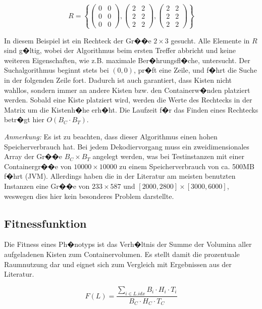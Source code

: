 \documentclass[a4paper,abstracton,12pt]{scrartcl}
\begin{document}
\begin{equation}
R = \left\{\begin{pmatrix}
0 & 0\\
0 & 0\\
0 & 0
\end{pmatrix}, \begin{pmatrix}
2 & 2\\
2 & 2\\
2 & 2
\end{pmatrix}, \begin{pmatrix}
2 & 2\\
2 & 2\\
2 & 2
\end{pmatrix}\right\}
\end{equation}

In diesem Beispiel ist ein Rechteck der Gr��e $2 \times 3$ gesucht. Alle Elemente in $R$ sind g�ltig, wobei der Algorithmus beim ersten Treffer abbricht und keine weiteren Eigenschaften, wie z.B. maximale Ber�hrungsfl�che, untersucht. Der Suchalgorithmus beginnt stets bei $(0,0)$, pr�ft eine Zeile, und f�hrt die Suche in der folgenden Zeile fort. Dadurch ist auch garantiert, dass Kisten nicht wahllos, sondern immer an andere Kisten bzw. den Containerw�nden platziert werden. Sobald eine Kiste platziert wird, werden die Werte des Rechtecks in der Matrix um die Kistenh�he erh�ht. Die Laufzeit f�r das Finden eines Rechtecks betr�gt hier $O(B_C \cdot B_T)$.

\emph{Anmerkung:} Es ist zu beachten, dass dieser Algorithmus einen hohen Speicherverbrauch hat. Bei jedem Dekodiervorgang muss ein zweidimensionales Array der Gr��e $B_C \times B_T$ angelegt werden, was bei Testinstanzen mit einer Containergr��e von $10000 \times 10000$ zu einem Speicherverbrauch von ca. 500MB f�hrt (JVM). Allerdings haben die in der Literatur am meisten benutzten Instanzen eine Gr��e von $233 \times 587$ und $[2000,2800] \times [3000,6000]$, weswegen dies hier kein besonderes Problem darstellte.

\subsection{Fitnessfunktion}

Die Fitness eines Ph�notyps ist das Verh�ltnis der Summe der Volumina aller aufgeladenen Kisten zum Containervolumen. Es stellt damit die prozentuale Raumnutzung dar und eignet sich zum Vergleich mit Ergebnissen aus der Literatur.

\begin{equation}
F(L) = \frac{\sum_{i\in L.idx} B_i \cdot H_i \cdot T_i}{B_C \cdot H_C \cdot T_C}
\end{equation}
\end{document}
